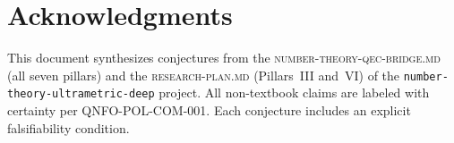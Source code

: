 \documentclass[12pt]{article}
\theoremstyle{definition}
\theoremstyle{plain}
\theoremstyle{remark}
\begin{document}
\section*{Acknowledgments}

This document synthesizes conjectures from the
\textsc{number-theory-qec-bridge.md} (all seven pillars) and the
\textsc{research-plan.md} (Pillars~III and~VI) of the
\texttt{number-theory-ultrametric-deep} project. All non-textbook
claims are labeled with certainty per QNFO-POL-COM-001. Each conjecture
includes an explicit falsifiability condition.
\end{document}
